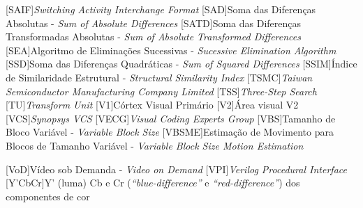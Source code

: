 \begin{acronym}
[SAIF]{\textit{Switching Activity Interchange Format}}
[SAD]{Soma das Diferenças Absolutas - \textit{Sum of Absolute Differences}}
[SATD]{Soma das Diferenças Transformadas Absolutas - \textit{Sum of Absolute Transformed Differences}}
[SEA]{Algoritmo de Eliminações Sucessivas - \textit{Sucessive Elimination Algorithm}}
[SSD]{Soma das Diferenças Quadráticas - \textit{Sum of Squared Differences}}
[SSIM]{Índice de Similaridade Estrutural - \textit{Structural Similarity Index}}
[TSMC]{\textit{Taiwan Semiconductor Manufacturing Company Limited}}
[TSS]{\textit{Three-Step Search}}
[TU]{\textit{Transform Unit}}
[V1]{Córtex Visual Primário}
[V2]{Área visual V2}
[VCS]{\textit{Synopsys VCS}}
[VECG]{\textit{Visual Coding Experts Group}}
[VBS]{Tamanho de Bloco Variável - \textit{Variable Block Size}}
[VBSME]{Estimação de Movimento para Blocos de Tamanho Variável - \textit{Variable Block Size Motion Estimation}}

[VoD]{Vídeo sob Demanda - \textit{Video on Demand}}
[VPI]{\textit{Verilog Procedural Interface}}
[Y'CbCr]{Y' (luma) Cb e Cr (\textit{``blue-difference''} e \textit{``red-difference''}) dos componentes de cor}


\renewcommand{\baselinestretch}{1}%
\large\normalsize%

\end{acronym}
